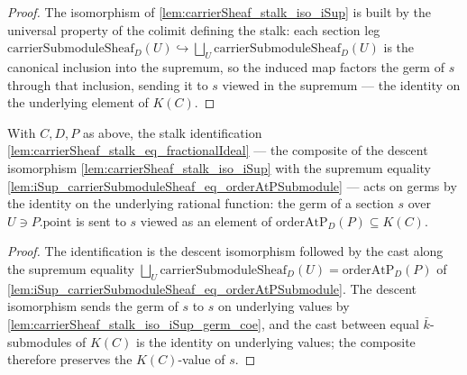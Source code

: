 \begin{proof}
  The isomorphism of \cref{lem:carrierSheaf_stalk_iso_iSup} is built by the
  universal property of the colimit defining the stalk: each section leg
  \(\mathrm{carrierSubmoduleSheaf}_D(U) \hookrightarrow
  \bigsqcup_{U} \mathrm{carrierSubmoduleSheaf}_D(U)\) is the canonical inclusion
  into the supremum, so the induced map factors the germ of \(s\) through that
  inclusion, sending it to \(s\) viewed in the supremum --- the identity on the
  underlying element of \(K(C)\).
\end{proof}


\begin{lemma}
  \label{lem:carrierSheaf_stalk_eq_hom_germ_coe}
  With \(C, D, P\) as above, the stalk identification
  \cref{lem:carrierSheaf_stalk_eq_fractionalIdeal} --- the composite of the
  descent isomorphism \cref{lem:carrierSheaf_stalk_iso_iSup} with the supremum
  equality \cref{lem:iSup_carrierSubmoduleSheaf_eq_orderAtPSubmodule} --- acts on
  germs by the identity on the underlying rational function: the germ of a
  section \(s\) over \(U \ni P.\mathrm{point}\) is sent to \(s\) viewed as an
  element of \(\mathrm{orderAtP}_D(P) \subseteq K(C)\).
\end{lemma}

\begin{proof}
  The identification is the descent isomorphism followed by the cast along the
  supremum equality \(\bigsqcup_{U} \mathrm{carrierSubmoduleSheaf}_D(U) =
  \mathrm{orderAtP}_D(P)\) of
  \cref{lem:iSup_carrierSubmoduleSheaf_eq_orderAtPSubmodule}. The descent
  isomorphism sends the germ of \(s\) to \(s\) on underlying values by
  \cref{lem:carrierSheaf_stalk_iso_iSup_germ_coe}, and the cast between equal
  \(\bar k\)-submodules of \(K(C)\) is the identity on underlying values; the
  composite therefore preserves the \(K(C)\)-value of \(s\).
\end{proof}


